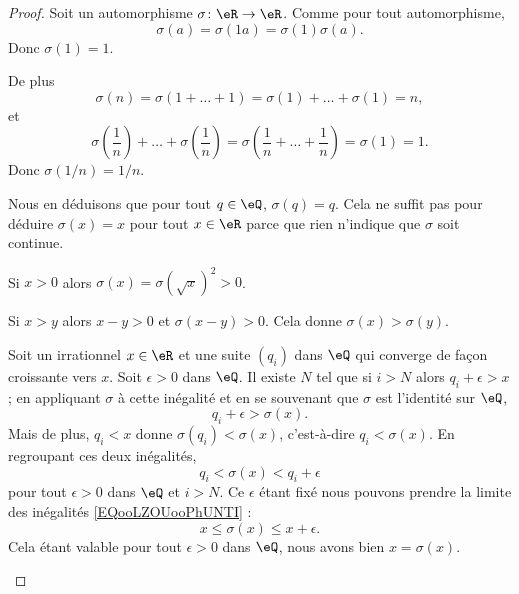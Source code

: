 \begin{proof}
	Soit un automorphisme \( \sigma\colon \eR\to \eR\). Comme pour tout automorphisme,
	\begin{equation}
		\sigma(a)=\sigma(1a)=\sigma(1)\sigma(a).
	\end{equation}
	Donc \( \sigma(1)=1\).

	\begin{subproof}
		De plus
		\begin{equation}
			\sigma(n)=\sigma(1+\ldots +1)=\sigma(1)+\ldots +\sigma(1)=n,
		\end{equation}
		et
		\begin{equation}
			\sigma\left( \frac{1}{ n } \right)+\ldots +\sigma\left( \frac{1}{ n } \right)=\sigma\left( \frac{1}{ n }+\ldots +\frac{1}{ n } \right)=\sigma(1)=1.
		\end{equation}
		Donc \( \sigma(1/n)=1/n\).

		Nous en déduisons que pour tout \( q\in \eQ\), \( \sigma(q)=q\). Cela ne suffit pas pour déduire \( \sigma(x)=x\) pour tout \( x\in \eR\) parce que rien n'indique que \( \sigma\) soit continue.

		Si \( x>0\) alors \( \sigma(x)=\sigma(\sqrt{ x })^2>0\).

		\spitem[Croissance]

		Si \( x>y\) alors \( x-y>0\) et \( \sigma(x-y)>0\). Cela donne \( \sigma(x)>\sigma(y)\).


		Soit un irrationnel \( x\in \eR\) et une suite \( (q_i)\) dans \( \eQ\) qui converge de façon croissante vers \( x\). Soit \( \epsilon>0\) dans \( \eQ\). Il existe \( N\) tel que si \( i>N\) alors \( q_i+\epsilon>x\); en appliquant \( \sigma\) à cette inégalité et en se souvenant que \( \sigma\) est l'identité sur \( \eQ\),
		\begin{equation}
			q_i+\epsilon>\sigma(x).
		\end{equation}
		Mais de plus, \( q_i<x\) donne \( \sigma(q_i)<\sigma(x)\), c'est-à-dire \( q_i<\sigma(x)\). En regroupant ces deux inégalités,
		\begin{equation}        \label{EQooLZOUooPhUNTI}
			q_i<\sigma(x)<q_i+\epsilon
		\end{equation}
		pour tout \( \epsilon>0\) dans \( \eQ\) et \( i>N\). Ce \( \epsilon\) étant fixé nous pouvons prendre la limite des inégalités \eqref{EQooLZOUooPhUNTI} :
		\begin{equation}
			x\leq \sigma(x)\leq x+\epsilon.
		\end{equation}
		Cela étant valable pour tout \( \epsilon>0\) dans \( \eQ\), nous avons bien \( x=\sigma(x)\).
	\end{subproof}
\end{proof}

